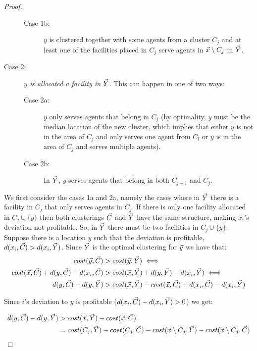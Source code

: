 \begin{proof}
\begin{description}
\begin{description}
        \item[Case 1b:] $y$ is clustered together with some agents from a cluster $C_j$ and at least one of the facilities placed in $C_j$ serve agents in $\vec{x}\setminus C_j$ in $\vec{Y}$.
\end{description}
        
\item[Case 2:] \textit{$y$ is allocated a facility in $\vec{Y}$}. This can happen in one of two ways:

 \begin{description}
        \item[Case 2a:] $y$ only serves agents that belong in $C_j$ (by optimality, $y$ must be the median location of the new cluster, which implies that either $y$ is not in the area of $C_j$ and only serves one agent from $C_l$ or $y$ is in the area of $C_j$ and serves multiple agents).
        \item[Case 2b:] In $\vec{Y}$, $y$ serves agents that belong in both $C_{j-1}$ and $C_j$.
\end{description}
\end{description}

We first consider the cases 1a and 2a, namely the cases where in $\vec{Y}$ there is a facility in $C_j$ that only serves agents in $C_j$. If there is only one facility allocated in $C_j\cup\{y\}$ then both clusterings $\vec{C}$ and $\vec{Y}$ have the same structure, making $x_i$'s deviation not profitable. So, in $\vec{Y}$ there must be two facilities in $C_j\cup\{y\}$. Suppose there is a location $y$ such that the deviation is profitable, $d(x_i,\vec{C}) > d(x_i,\vec{Y})$. Since $\vec{Y}$ is the optimal clustering for $\vec{y}$ we have that:
\begin{align*}
    cost(\vec{y},\vec{C}) &> cost(\vec{y},\vec{Y}) \iff \\
    cost(\vec{x},\vec{C}) + d(y,\vec{C}) - d(x_i,\vec{C}) &> cost(\vec{x},\vec{Y}) + d(y,\vec{Y}) - d(x_i,\vec{Y}) \iff \\
    d(y,\vec{C}) - d(y,\vec{Y}) &> cost(\vec{x},\vec{Y}) - cost(\vec{x},\vec{C})  + d(x_i,\vec{C}) - d(x_i,\vec{Y})
\end{align*}

Since $i$'s deviation to $y$ is profitable ($d(x_i,\vec{C}) - d(x_i,\vec{Y})>0$) we get:

\begin{align}
\begin{split}
d(y,\vec{C}) - d(y,\vec{Y}) &> cost(\vec{x},\vec{Y}) - cost(\vec{x},\vec{C})\label{eq:gainy} \\
&= cost(C_j,\vec{Y})-cost(C_j,\vec{C})-cost(\vec{x}\setminus C_j,\vec{Y})-cost(\vec{x}\setminus C_j,\vec{C})
\end{split}
\end{align}



\end{proof}
